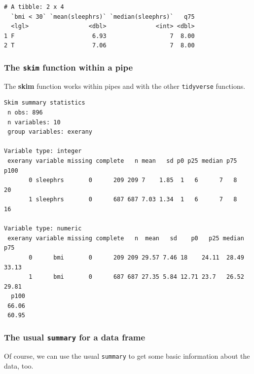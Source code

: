 \documentclass[]{book}
\newenvironment{Shaded}{\begin{snugshade}}{\end{snugshade}}
\newcommand{\KeywordTok}[1]{\textcolor[rgb]{0.13,0.29,0.53}{\textbf{#1}}}
\newcommand{\StringTok}[1]{\textcolor[rgb]{0.31,0.60,0.02}{#1}}
\newcommand{\OperatorTok}[1]{\textcolor[rgb]{0.81,0.36,0.00}{\textbf{#1}}}
\newcommand{\NormalTok}[1]{#1}
\theoremstyle{definition}
\theoremstyle{definition}
\theoremstyle{definition}
\theoremstyle{remark}
\begin{document}
\begin{verbatim}
# A tibble: 2 x 4
  `bmi < 30` `mean(sleephrs)` `median(sleephrs)`   q75
  <lgl>                 <dbl>              <int> <dbl>
1 F                      6.93                  7  8.00
2 T                      7.06                  7  8.00
\end{verbatim}

\subsubsection{\texorpdfstring{The \texttt{skim} function within a
pipe}{The skim function within a pipe}}\label{the-skim-function-within-a-pipe}

The \textbf{skim} function works within pipes and with the other
\texttt{tidyverse} functions.

\begin{Shaded}
\end{Shaded}

\begin{verbatim}
Skim summary statistics
 n obs: 896 
 n variables: 10 
 group variables: exerany 

Variable type: integer 
 exerany variable missing complete   n mean   sd p0 p25 median p75 p100
       0 sleephrs       0      209 209 7    1.85  1   6      7   8   20
       1 sleephrs       0      687 687 7.03 1.34  1   6      7   8   16

Variable type: numeric 
 exerany variable missing complete   n  mean   sd    p0   p25 median   p75
       0      bmi       0      209 209 29.57 7.46 18    24.11  28.49 33.13
       1      bmi       0      687 687 27.35 5.84 12.71 23.7   26.52 29.81
  p100
 66.06
 60.95
\end{verbatim}

\subsubsection{\texorpdfstring{The usual \texttt{summary} for a data
frame}{The usual summary for a data frame}}\label{the-usual-summary-for-a-data-frame}

Of course, we can use the usual \texttt{summary} to get some basic
information about the data, too.
\end{document}

